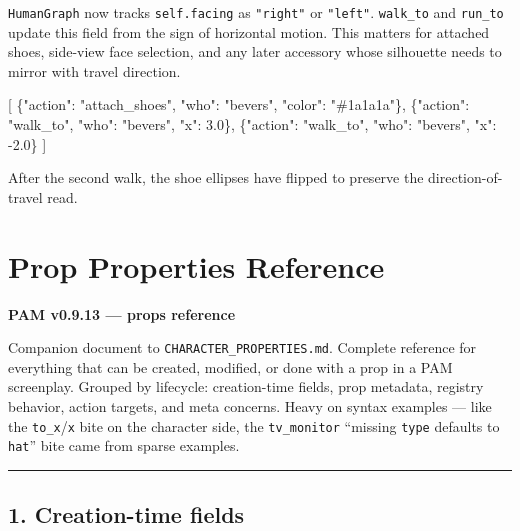 \documentclass[
  12pt,
  letterpaper,
]{book}
\newenvironment{Shaded}{}{}
\newcommand{\DataTypeTok}[1]{\textcolor[rgb]{0.56,0.13,0.00}{#1}}
\newcommand{\FloatTok}[1]{\textcolor[rgb]{0.25,0.63,0.44}{#1}}
\newcommand{\FunctionTok}[1]{\textcolor[rgb]{0.02,0.16,0.49}{#1}}
\newcommand{\OtherTok}[1]{\textcolor[rgb]{0.00,0.44,0.13}{#1}}
\newcommand{\StringTok}[1]{\textcolor[rgb]{0.25,0.44,0.63}{#1}}
\begin{document}
\texttt{HumanGraph} now tracks \texttt{self.facing} as \texttt{"right"}
or \texttt{"left"}. \texttt{walk\_to} and \texttt{run\_to} update this
field from the sign of horizontal motion. This matters for attached
shoes, side-view face selection, and any later accessory whose
silhouette needs to mirror with travel direction.

\begin{Shaded}
\begin{Highlighting}[]
\OtherTok{[}
  \FunctionTok{\{}\DataTypeTok{"action"}\FunctionTok{:} \StringTok{"attach\_shoes"}\FunctionTok{,} \DataTypeTok{"who"}\FunctionTok{:} \StringTok{"bevers"}\FunctionTok{,} \DataTypeTok{"color"}\FunctionTok{:} \StringTok{"\#1a1a1a"}\FunctionTok{\}}\OtherTok{,}
  \FunctionTok{\{}\DataTypeTok{"action"}\FunctionTok{:} \StringTok{"walk\_to"}\FunctionTok{,} \DataTypeTok{"who"}\FunctionTok{:} \StringTok{"bevers"}\FunctionTok{,} \DataTypeTok{"x"}\FunctionTok{:} \FloatTok{3.0}\FunctionTok{\}}\OtherTok{,}
  \FunctionTok{\{}\DataTypeTok{"action"}\FunctionTok{:} \StringTok{"walk\_to"}\FunctionTok{,} \DataTypeTok{"who"}\FunctionTok{:} \StringTok{"bevers"}\FunctionTok{,} \DataTypeTok{"x"}\FunctionTok{:} \FloatTok{{-}2.0}\FunctionTok{\}}
\OtherTok{]}
\end{Highlighting}
\end{Shaded}

After the second walk, the shoe ellipses have flipped to preserve the
direction-of-travel read.


\chapter{Prop Properties Reference}\label{prop-properties-reference}

\textbf{PAM v0.9.13 --- props reference}

Companion document to \texttt{CHARACTER\_PROPERTIES.md}. Complete
reference for everything that can be created, modified, or done with a
prop in a PAM screenplay. Grouped by lifecycle: creation-time fields,
prop metadata, registry behavior, action targets, and meta concerns.
Heavy on syntax examples --- like the \texttt{to\_x}/\texttt{x} bite on
the character side, the \texttt{tv\_monitor} ``missing \texttt{type}
defaults to \texttt{hat}'' bite came from sparse examples.

\begin{center}\rule{0.5\linewidth}{0.5pt}\end{center}

\section{1. Creation-time fields}\label{creation-time-fields}
\end{document}
